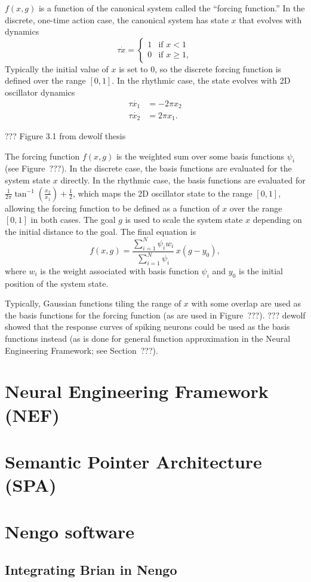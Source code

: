 $f(x, g)$ is a function
of the canonical system
called the ``forcing function.''
In the discrete, one-time action case,
the canonical system
has state $x$ that evolves
with dynamics
\begin{equation}
  \label{dmp-discrete}
  \tau\dot{x} =
  \begin{cases}
    1 &\text{if } x < 1 \\
    0 &\text{if } x \ge 1,
  \end{cases}
\end{equation}
Typically the initial value of $x$
is set to 0,
so the discrete forcing function
is defined over the range $[0, 1]$.
In the rhythmic case,
the state evolves with
2D oscillator dynamics
\begin{align}
  \tau \dot{x_1} &= -2 \pi x_2 \nonumber \\
  \tau \dot{x_2} &= 2 \pi x_1.
  \label{dmp-rhythmic}
\end{align}

??? Figure 3.1 from dewolf thesis

The forcing function $f(x, g)$ is
the weighted sum
over some basis functions
$\psi_i$
(see Figure~???).
In the discrete case,
the basis functions are evaluated
for the system state $x$ directly.
In the rhythmic case,
the basis functions are evaluated
for $\frac{1}{2\pi}\tan^{-1}\left(\frac{x_2}{x_1}\right) + \frac{1}{2}$,
which maps the 2D oscillator state
to the range $[0, 1]$,
allowing the forcing function to be defined
as a function of $x$ over the range $[0, 1]$
in both cases.
The goal $g$ is used
to scale the system state $x$ depending on
the initial distance to the goal.
The final equation is
\begin{equation}
  \label{dmp-forcing-func}
  f(x, g) = \frac{\sum_{i=1}^N \psi_i w_i}{\sum_{i=1}^N \psi_i} \, x(g - y_0),
\end{equation}
where $w_i$ is the weight associated with
basis function $\psi_i$ and $y_0$
is the initial position of
the system state.

Typically, Gaussian functions
tiling the range of $x$ with some overlap
are used as the basis functions
for the forcing function
(as are used in Figure~???).
??? dewolf showed that
the response curves of spiking neurons
could be used as the
basis functions instead
(as is done for general function approximation
in the Neural Engineering Framework;
see Section~???).

\section{Neural Engineering Framework (NEF)}

\section{Semantic Pointer Architecture (SPA)}

\section{Nengo software}

\subsection{Integrating Brian in Nengo}
